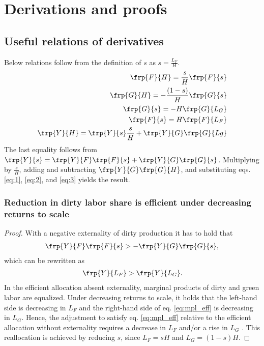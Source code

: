 \clearpage
\appendix
\section{Derivations and proofs}\label{app:derivations}

\subsection{Useful relations of derivatives}\label{app:dervs_use}
Below relations follow from the definition of $s$ as $s=\frac{L_F}{H}$.
\begin{align}
\frp{F}{H}=\frac{s}{H}\frp{F}{s}\label{eq:1}\\
\frp{G}{H}=-\frac{(1-s)}{H}\frp{G}{s}\label{eq:2}\\
\frp{G}{s}=-H\frp{G}{L_G}\label{eq:3}\\
\frp{F}{s}=H\frp{F}{L_F}\nonumber\\
\frp{Y}{H}= \frp{Y}{s}\frac{s}{H}+\frp{Y}{G}\frp{G}{Lg}\nonumber
\end{align}
The last equality follows from $\frp{Y}{s}=\frp{Y}{F}\frp{F}{s}+\frp{Y}{G}\frp{G}{s}$. Multiplying by $\frac{s}{H}$, adding and subtracting $\frp{Y}{G}\frp{G}{H}$, and substituting eqs. \eqref{eq:1}, \eqref{eq:2}, and \eqref{eq:3} yields the result. 
\subsubsection{Reduction in dirty labor share is efficient under decreasing returns to scale}\label{app:redeffs}
\begin{proof}
	With a negative externality of dirty production it has to hold that 
	\begin{align*}
	\frp{Y}{F}\frp{F}{s}>-\frp{Y}{G}\frp{G}{s},
	\end{align*}
	which can be rewritten as 
	\begin{align}\label{eq:mpl_eff}
	\frp{Y}{L_F}>\frp{Y}{L_G}. 
	\end{align}
	In the efficient allocation absent externality, marginal products of dirty and green labor are equalized. 
	Under decreasing returns to scale, it holds that the left-hand side is decreasing in $L_F$ and the right-hand side of eq. \eqref{eq:mpl_eff} is decreasing in $L_G$. Hence, the adjustment to satisfy eq. \eqref{eq:mpl_eff} relative to the efficient allocation without externality requires a decrease in $L_F$ and/or a rise in $L_G$  .
	This reallocation is achieved by reducing $s$, since $L_F=sH$ and $L_G=(1-s)H$.	
\end{proof}



